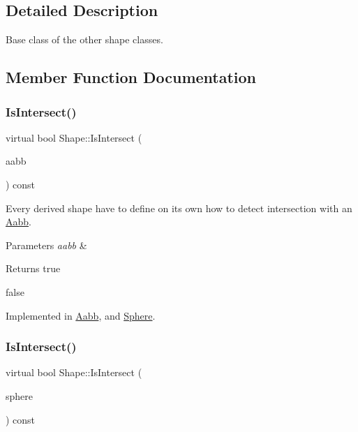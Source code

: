\subsection{Detailed Description}
Base class of the other shape classes. 

\subsection{Member Function Documentation}
\mbox{\label{classShape_a1bfc3d6c995c4326d4691b22d16d2f12}} 
\subsubsection{\texorpdfstring{Is\+Intersect()}{IsIntersect()}\hspace{0.1cm}{\footnotesize\ttfamily [1/2]}}
{\footnotesize\ttfamily virtual bool Shape\+::\+Is\+Intersect (\begin{DoxyParamCaption}\item[{const \hyperlink{classAabb}{Aabb} \&}]{aabb }\end{DoxyParamCaption}) const\hspace{0.3cm}{\ttfamily [pure virtual]}}



Every derived shape have to define on its own how to detect intersection with an \hyperlink{classAabb}{Aabb}. 


\begin{DoxyParams}{Parameters}
{\em aabb} & \\
\hline
\end{DoxyParams}
\begin{DoxyReturn}{Returns}
true 

false 
\end{DoxyReturn}


Implemented in \hyperlink{classAabb_a98746a9bae7409bd1cf3734125b62da6}{Aabb}, and \hyperlink{classSphere_aea1571e835842f502a64e4ddb30847e4}{Sphere}.

\mbox{\label{classShape_a1c942dca54e0d81f685624f33f2ce6c8}} 
\subsubsection{\texorpdfstring{Is\+Intersect()}{IsIntersect()}\hspace{0.1cm}{\footnotesize\ttfamily [2/2]}}
{\footnotesize\ttfamily virtual bool Shape\+::\+Is\+Intersect (\begin{DoxyParamCaption}\item[{const \hyperlink{classSphere}{Sphere} \&}]{sphere }\end{DoxyParamCaption}) const\hspace{0.3cm}{\ttfamily [pure virtual]}}



